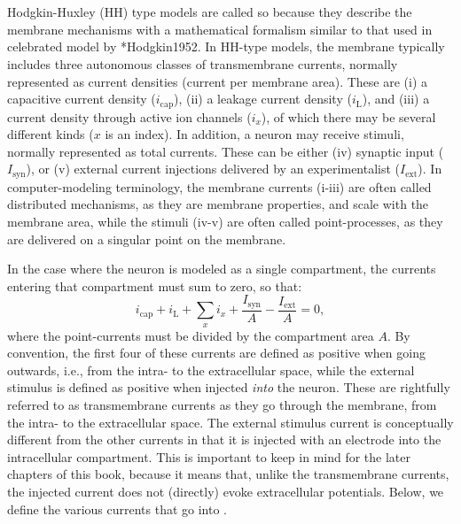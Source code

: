 \section{}
\label{sec:Neuron:membranecurrents}
Hodgkin-Huxley (HH) type models are called so because they describe the membrane mechanisms with a mathematical formalism similar to that used in  celebrated model by \citeasnoun**{Hodgkin1952}. In HH-type models, the membrane typically includes three autonomous classes of transmembrane currents, normally represented as current densities (current per membrane area). These are (i) a capacitive current density ($i_{\mathrm{cap}}$), (ii) a leakage current density ($i_{\mathrm{L}}$), and (iii) a current density through active ion channels ($i_x$), of which there may be several different kinds ($x$ is an index). In addition, a neuron may receive stimuli, normally represented as total currents. These can be either (iv) synaptic input ($I_{\mathrm{syn}}$), or (v) external current injections delivered by an experimentalist ($I_{\mathrm{ext}}$). In computer-modeling terminology, the membrane currents (i-iii) are often called distributed mechanisms, as they are membrane properties, and scale with the membrane area, while the stimuli (iv-v) are often called point-processes, as they are delivered on a singular point on the membrane. 

In the case where the neuron is modeled as a single compartment, the currents entering that compartment must sum to zero, so that:
\begin{equation}
i_{\mathrm{cap}}+ i_{\mathrm{L}} + \sum_x{i_x} +  \frac{I_{\mathrm{syn}}}{A} - \frac{I_{\mathrm{ext}}}{A} = 0,
\label{eq:Neuron:singlecomp_zerosum}
\end{equation}
where the point-currents must be divided by the compartment area $A$. By convention, the first four of these currents are defined as positive when going outwards, i.e., from the intra- to the extracellular space, while the external stimulus is defined as positive when injected \textit{into} the neuron. These are rightfully referred to as transmembrane currents as they go through the membrane, from the intra- to the extracellular space. The external stimulus current is conceptually different from the other currents in that it is injected with an electrode into the intracellular compartment. This is important to keep in mind for the later chapters of this book, because it means that, unlike the transmembrane currents, the injected current does not (directly) evoke extracellular potentials.  
 Below, we define the various currents that go into . 

